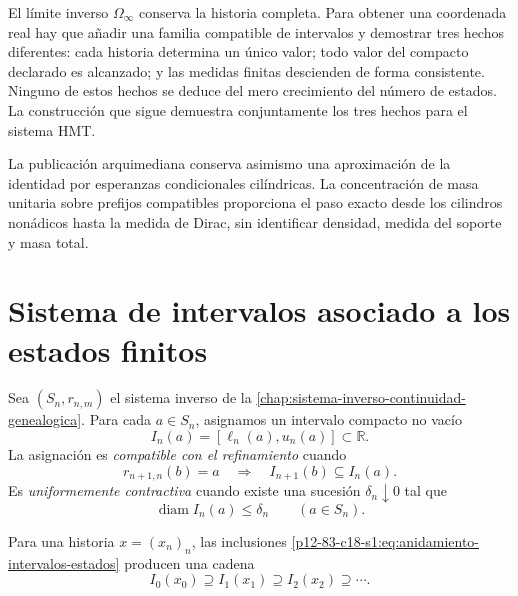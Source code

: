 \label{chap:83-18}

El límite inverso \(\Omega_\infty\) conserva la historia completa. Para
obtener una coordenada real hay que añadir una familia compatible de
intervalos y demostrar tres hechos diferentes: cada historia determina un
único valor; todo valor del compacto declarado es alcanzado; y las medidas
finitas descienden de forma consistente. Ninguno de estos hechos se deduce
del mero crecimiento del número de estados. La construcción que sigue
demuestra conjuntamente los tres hechos para el sistema HMT.

La publicación arquimediana conserva asimismo una aproximación de la
identidad por esperanzas condicionales cilíndricas. La concentración de masa
unitaria sobre prefijos compatibles proporciona el paso exacto desde los
cilindros nonádicos hasta la medida de Dirac, sin identificar densidad,
medida del soporte y masa total.

\begin{HMTScientificOwnerSubordinated}

\end{HMTScientificOwnerSubordinated}

\section{Sistema de intervalos asociado a los estados finitos}

Sea \((S_n,r_{n,m})\) el sistema inverso de la
\cref{chap:sistema-inverso-continuidad-genealogica}. Para cada
\(a\in S_n\), asignamos un intervalo compacto no vacío
\begin{equation}
 I_n(a)=[\ell_n(a),u_n(a)]\subset\mathbb R.
 \label{p12-83-c18-s1:eq:intervalo-asociado-estado}
\end{equation}
La asignación es \emph{compatible con el refinamiento} cuando
\begin{equation}
 r_{n+1,n}(b)=a
 \quad\Longrightarrow\quad
 I_{n+1}(b)\subseteq I_n(a).
 \label{p12-83-c18-s1:eq:anidamiento-intervalos-estados}
\end{equation}
Es \emph{uniformemente contractiva} cuando existe una sucesión
\(\delta_n\downarrow0\) tal que
\begin{equation}
 \operatorname{diam}I_n(a)\leq\delta_n
 \qquad(a\in S_n).
 \label{p12-83-c18-s1:eq:contraccion-uniforme-intervalos}
\end{equation}

Para una historia \(x=(x_n)_n\), las inclusiones
\eqref{p12-83-c18-s1:eq:anidamiento-intervalos-estados} producen una cadena
\begin{equation}
 I_0(x_0)\supseteq I_1(x_1)\supseteq I_2(x_2)\supseteq\cdots.
 \label{p12-83-c18-s1:eq:cadena-intervalos-historia}
\end{equation}

